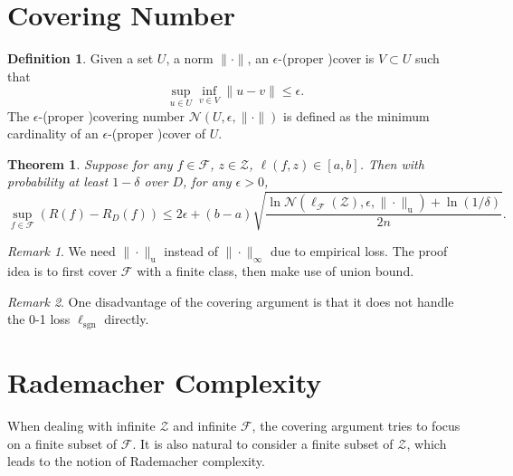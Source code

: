 \documentclass[openany]{book}
\newtheorem{theorem}{Theorem}[chapter]
\theoremstyle{definition}
\newtheorem{definition}{Definition}[chapter]
\theoremstyle{remark}
\newtheorem*{remark}{Remark}
\begin{document}
\section{Covering Number}
\begin{definition}
    Given a set $U$, a norm $\|\cdot\|$, an $\epsilon$-(proper )cover is $V\subset U$ such that
    \begin{equation*}
        \sup_{u\in U}\inf_{v\in V}\|u-v\|\le\epsilon.
    \end{equation*}
    The $\epsilon$-(proper )covering number $\mathcal{N}(U,\epsilon,\|\cdot\|)$ is defined as the minimum cardinality of an $\epsilon$-(proper )cover of $U$.
\end{definition}
\begin{theorem}
    Suppose for any $f\in \mathcal{F}$, $z\in \mathcal{Z}$, $\ell(f,z)\in[a,b]$. Then with probability at least $1-\delta$ over $D$, for any $\epsilon>0$,
    \begin{equation*}
        \sup_{f\in \mathcal{F}}\left(R(f)-R_{D}(f)\right)\le2\epsilon+(b-a)\sqrt{\frac{\ln \mathcal{N}\left(\ell_{\mathcal{F}}(\mathcal{Z}),\epsilon,\|\cdot\|_{\mathrm{u}}\right)+\ln(1/\delta)}{2n}}.
    \end{equation*}
\end{theorem}
\begin{remark}
    We need $\|\cdot\|_{\mathrm{u}}$ instead of $\|\cdot\|_{\infty}$ due to empirical loss. The proof idea is to first cover $\mathcal{F}$ with a finite class, then make use of union bound.
\end{remark}
\begin{remark}
    One disadvantage of the covering argument is that it does not handle the 0-1 loss $\ell_{\mathrm{sgn}}$ directly.
\end{remark}

\section{Rademacher Complexity}
When dealing with infinite $\mathcal{Z}$ and infinite $\mathcal{F}$, the covering argument tries to focus on a finite subset of $\mathcal{F}$. It is also natural to consider a finite subset of $\mathcal{Z}$, which leads to the notion of Rademacher complexity.
\end{document}
